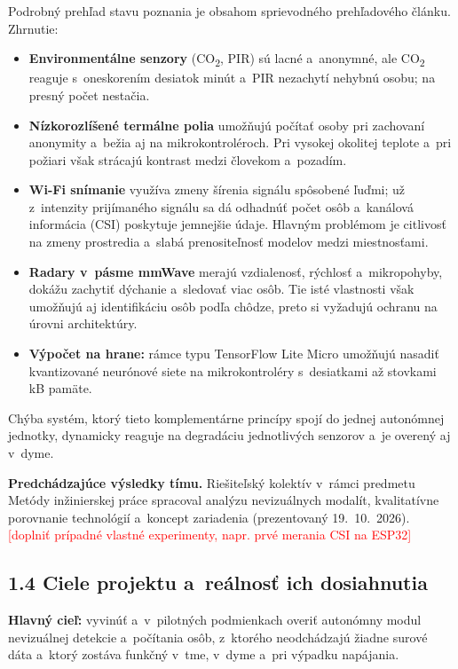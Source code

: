 \documentclass[11pt,a4paper]{article}
\newcommand{\doplnit}[1]{\textcolor{red}{[#1]}}
\begin{document}
Podrobný prehľad stavu poznania je obsahom sprievodného prehľadového článku. Zhrnutie:
\begin{itemize}
\item \textbf{Environmentálne senzory} (CO\textsubscript{2}, PIR) sú lacné a~anonymné, ale CO\textsubscript{2} reaguje s~oneskorením desiatok minút a~PIR nezachytí nehybnú osobu; na presný počet nestačia.
\item \textbf{Nízkorozlíšené termálne polia} umožňujú počítať osoby pri zachovaní anonymity a~bežia aj na mikrokontroléroch. Pri vysokej okolitej teplote a~pri požiari však strácajú kontrast medzi človekom a~pozadím.
\item \textbf{Wi-Fi snímanie} využíva zmeny šírenia signálu spôsobené ľuďmi; už z~intenzity prijímaného signálu sa dá odhadnúť počet osôb a~kanálová informácia (CSI) poskytuje jemnejšie údaje. Hlavným problémom je citlivosť na zmeny prostredia a~slabá prenositeľnosť modelov medzi miestnosťami.
\item \textbf{Radary v~pásme mmWave} merajú vzdialenosť, rýchlosť a~mikropohyby, dokážu zachytiť dýchanie a~sledovať viac osôb. Tie isté vlastnosti však umožňujú aj identifikáciu osôb podľa chôdze, preto si vyžadujú ochranu na úrovni architektúry.
\item \textbf{Výpočet na hrane:} rámce typu TensorFlow Lite Micro umožňujú nasadiť kvantizované neurónové siete na mikrokontroléry s~desiatkami až stovkami kB pamäte.
\end{itemize}
Chýba systém, ktorý tieto komplementárne princípy spojí do jednej autonómnej jednotky, dynamicky reaguje na degradáciu jednotlivých senzorov a~je overený aj v~dyme.

\textbf{Predchádzajúce výsledky tímu.} Riešiteľský kolektív v~rámci predmetu Metódy inžinierskej práce spracoval analýzu nevizuálnych modalít, kvalitatívne porovnanie technológií a~koncept zariadenia (prezentovaný 19.~10.~2026). \doplnit{doplniť prípadné vlastné experimenty, napr. prvé merania CSI na ESP32}

\subsection*{1.4 Ciele projektu a~reálnosť ich dosiahnutia}

\textbf{Hlavný cieľ:} vyvinúť a~v~pilotných podmienkach overiť autonómny modul nevizuálnej detekcie a~počítania osôb, z~ktorého neodchádzajú žiadne surové dáta a~ktorý zostáva funkčný v~tme, v~dyme a~pri výpadku napájania.
\end{document}
